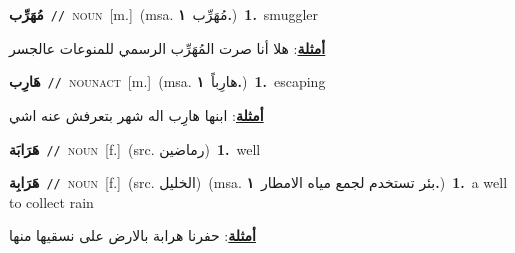 \documentclass[10pt,a4paper,twoside]{article} %
\begin{document}
\begin{multicols}{2}
{\setlength\topsep{0pt}\textbf{\foreignlanguage{arabic}{مُهَرِّب}}\ {\color{gray}\texttt{//}\color{black}}\ \textsc{noun}\ [m.]\ \color{gray}(msa. \foreignlanguage{arabic}{مُهَرِّب}~\foreignlanguage{arabic}{\textbf{١.}})\color{black}\ \textbf{1.}~smuggler\  \begin{flushright}\color{gray}\foreignlanguage{arabic}{\textbf{\underline{\foreignlanguage{arabic}{أمثلة}}}: هلا أنا صرت المُهَرِّب الرسمي للمنوعات عالجسر}\end{flushright}\color{black}} \vspace{2mm}

{\setlength\topsep{0pt}\textbf{\foreignlanguage{arabic}{هَارِب}}\ {\color{gray}\texttt{//}\color{black}}\ \textsc{noun\textunderscore act}\ [m.]\ \color{gray}(msa. \foreignlanguage{arabic}{هارِباً}~\foreignlanguage{arabic}{\textbf{١.}})\color{black}\ \textbf{1.}~escaping\  \begin{flushright}\color{gray}\foreignlanguage{arabic}{\textbf{\underline{\foreignlanguage{arabic}{أمثلة}}}: ابنها هارِب اله شهر بتعرفش عنه اشي}\end{flushright}\color{black}} \vspace{2mm}

{\setlength\topsep{0pt}\textbf{\foreignlanguage{arabic}{هَرَابَة}}\ {\color{gray}\texttt{//}\color{black}}\ \textsc{noun}\ [f.]\ (src. \color{gray}\foreignlanguage{arabic}{رماضين}\color{black})\ \textbf{1.}~well\ } \vspace{2mm}

{\setlength\topsep{0pt}\textbf{\foreignlanguage{arabic}{هَرَابِة}}\ {\color{gray}\texttt{//}\color{black}}\ \textsc{noun}\ [f.]\ (src. \color{gray}\foreignlanguage{arabic}{الخليل}\color{black})\ \color{gray}(msa. \foreignlanguage{arabic}{بئر تستخدم لجمع مياه الامطار}~\foreignlanguage{arabic}{\textbf{١.}})\color{black}\ \textbf{1.}~a well to collect rain\  \begin{flushright}\color{gray}\foreignlanguage{arabic}{\textbf{\underline{\foreignlanguage{arabic}{أمثلة}}}: حفرنا هرابة بالارض على نسقيها منها}\end{flushright}\color{black}} \vspace{2mm}


\end{multicols}
\end{document}
